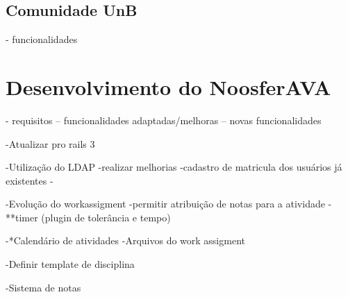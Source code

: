 \subsection{Comunidade UnB}
\label{comunidade-unb}
- funcionalidades

\section{Desenvolvimento do NoosferAVA}
\label{desen-noosferAVA}
- requisitos
-- funcionalidades adaptadas/melhoras
-- novas funcionalidades

-Atualizar pro rails 3

-Utilização do LDAP
	-realizar melhorias
		-cadastro de matricula dos usuários já existentes
		-

-Evolução do workassigment
	-permitir atribuição de notas para a atividade
	-**timer (plugin de tolerância e tempo)

-*Calendário de atividades
	-Arquivos do work assigment

-Definir template de disciplina

-Sistema de notas
